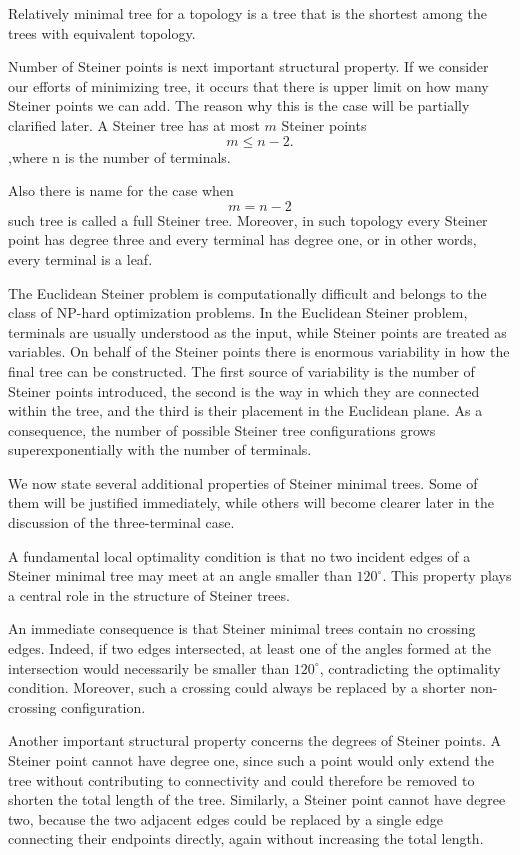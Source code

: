 \documentclass[openany]{book}
\begin{document}
	Relatively minimal tree for a topology is a tree that is the shortest among the trees with equivalent topology.
	
	Number of Steiner points is next important structural property. If we consider our efforts of minimizing tree, it occurs that there is upper limit on how many Steiner points we can add. The reason why this is the case will be partially clarified later.
	A Steiner tree has at most \(m\) Steiner points
	\[
	m \le n-2.
	\]
	,where n is the number of terminals.
	
	Also there is name for the case when
	\[
	m = n-2
	\]
	such tree is called a full Steiner tree.
	Moreover, in such topology every Steiner point has degree three and every terminal has degree one, or in other words, every terminal is a leaf.
	
	The Euclidean Steiner problem is computationally difficult and belongs to the class of NP-hard optimization problems. In the Euclidean Steiner problem, terminals are usually understood as the input, while Steiner points are treated as variables. On behalf of the Steiner points there is enormous variability in how the final tree can be constructed. The first source of variability is the number of Steiner points introduced, the second is the way in which they are connected within the tree, and the third is their placement in the Euclidean plane. As a consequence, the number of possible Steiner tree configurations grows superexponentially with the number of terminals. 
	
	We now state several additional properties of Steiner minimal trees. Some of them will be justified immediately, while others will become clearer later in the discussion of the three-terminal case.
	
	A fundamental local optimality condition is that no two incident edges of a Steiner minimal tree may meet at an angle smaller than \(120^\circ\). This property plays a central role in the structure of Steiner trees.
	
	An immediate consequence is that Steiner minimal trees contain no crossing edges. Indeed, if two edges intersected, at least one of the angles formed at the intersection would necessarily be smaller than \(120^\circ\), contradicting the optimality condition. Moreover, such a crossing could always be replaced by a shorter non-crossing configuration.
	
	Another important structural property concerns the degrees of Steiner points. A Steiner point cannot have degree one, since such a point would only extend the tree without contributing to connectivity and could therefore be removed to shorten the total length of the tree. Similarly, a Steiner point cannot have degree two, because the two adjacent edges could be replaced by a single edge connecting their endpoints directly, again without increasing the total length.
	
\end{document}
